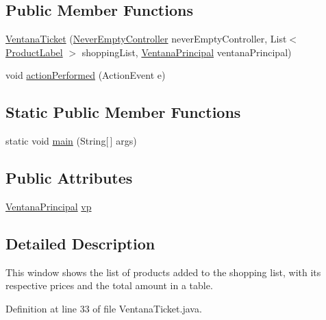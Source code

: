 \subsection*{Public Member Functions}
\begin{DoxyCompactItemize}
\item 
\mbox{\hyperlink{class_s_p_q_1_1gui_1_1_ventana_ticket_a27ed535b91869f2e407303220482288e}{Ventana\+Ticket}} (\mbox{\hyperlink{class_s_p_q_1_1controller_1_1_never_empty_controller}{Never\+Empty\+Controller}} never\+Empty\+Controller, List$<$ \mbox{\hyperlink{class_s_p_q_1_1gui_1_1component_1_1_product_label}{Product\+Label}} $>$ shopping\+List, \mbox{\hyperlink{class_s_p_q_1_1gui_1_1_ventana_principal}{Ventana\+Principal}} ventana\+Principal)
\item 
void \mbox{\hyperlink{class_s_p_q_1_1gui_1_1_ventana_ticket_ae0cea5da2b1b3819f0c934775f6c5816}{action\+Performed}} (Action\+Event e)
\end{DoxyCompactItemize}
\subsection*{Static Public Member Functions}
\begin{DoxyCompactItemize}
\item 
static void \mbox{\hyperlink{class_s_p_q_1_1gui_1_1_ventana_ticket_a12b988a7f931a5e82ff48a47c7c07409}{main}} (String\mbox{[}$\,$\mbox{]} args)
\end{DoxyCompactItemize}
\subsection*{Public Attributes}
\begin{DoxyCompactItemize}
\item 
\mbox{\hyperlink{class_s_p_q_1_1gui_1_1_ventana_principal}{Ventana\+Principal}} \mbox{\hyperlink{class_s_p_q_1_1gui_1_1_ventana_ticket_a0aef577c7b99bffe0ff8a050c7cc63c0}{vp}}
\end{DoxyCompactItemize}


\subsection{Detailed Description}
This window shows the list of products added to the shopping list, with its respective prices and the total amount in a table. 

Definition at line 33 of file Ventana\+Ticket.\+java.



